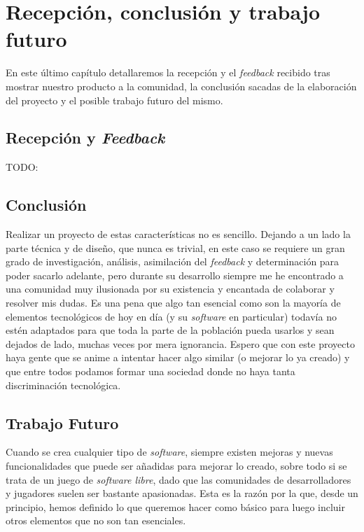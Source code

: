 \chapter{Recepción, conclusión y trabajo futuro}

En este último capítulo detallaremos la recepción y el \textit{feedback} recibido tras mostrar nuestro producto a la comunidad, la conclusión sacadas de la elaboración del proyecto y el posible trabajo futuro del mismo.

\section{Recepción y \textit{Feedback}}

TODO:

\section{Conclusión}

Realizar un proyecto de estas características no es sencillo. Dejando a un lado la parte técnica y de diseño, que nunca es trivial, en este caso se requiere un gran grado de investigación, análisis, asimilación del \textit{feedback} y determinación para poder sacarlo adelante, pero durante su desarrollo siempre me he encontrado a una comunidad muy ilusionada por su existencia y encantada de colaborar y resolver mis dudas. 
Es una pena que algo tan esencial como son la mayoría de elementos tecnológicos de hoy en día (y su \textit{software} en particular) todavía no estén adaptados para que toda la parte de la población pueda usarlos y sean dejados de lado, muchas veces por mera ignorancia. Espero que con este proyecto haya gente que se anime a intentar hacer algo similar (o mejorar lo ya creado) y que entre todos podamos formar una sociedad donde no haya tanta discriminación tecnológica.

\section{Trabajo Futuro}

Cuando se crea cualquier tipo de \textit{software}, siempre existen mejoras y nuevas funcionalidades que puede ser añadidas para mejorar lo creado, sobre todo si se trata de un juego de \textit{software libre}, dado que las comunidades de desarrolladores y jugadores suelen ser bastante apasionadas. Esta es la razón por la que, desde un principio, hemos definido lo que queremos hacer como básico para luego incluir otros elementos que no son tan esenciales.

